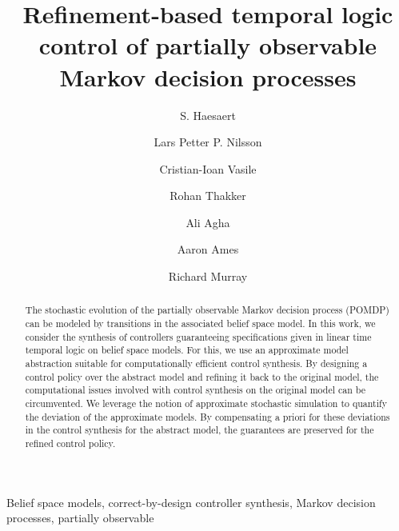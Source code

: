 \documentclass{ifacconf}
\begin{document}
\begin{frontmatter}

\title{\huge Refinement-based temporal logic control of partially observable Markov decision processes }

\author[cal]{S. Haesaert} 
\author[cal]{Lars Petter P.  Nilsson} 
\author[mit]{Cristian-Ioan Vasile}
\author[jpl]{Rohan Thakker}
\author[jpl]{Ali Agha}
\author[cal]{Aaron Ames}
\author[cal]{Richard Murray}


\address[cal]{California Institute of Technology, 
   Pasadena, CA 91125 USA} %
\address[mit]{Massachusetts Institute of Technology, 
   Cambridge, MA 02139 USA}%
\address[jpl]{Jet Propulsion Laboratory, 
   Pasadena, CA 91109 USA}%
\maketitle
\begin{abstract}
The stochastic evolution of the partially observable Markov decision process (POMDP) can be modeled by transitions in the associated belief space model.
In this work, we consider the synthesis of controllers guaranteeing  specifications given in linear time temporal logic on belief space models.
For this, we use an approximate model abstraction%
 suitable for computationally efficient control synthesis. By designing a control policy over the abstract model and refining it back to the original model, the computational issues involved with control synthesis on the original model can be circumvented. 
We leverage the notion of approximate stochastic simulation to quantify the deviation of the approximate models.  %
By compensating a priori for these deviations in the control synthesis for the abstract model, the guarantees are preserved for the refined control policy.
\end{abstract}
\begin{keyword} Belief space models,
correct-by-design controller synthesis, Markov decision processes, partially observable
\end{keyword}

\end{frontmatter}
 
\end{document}
